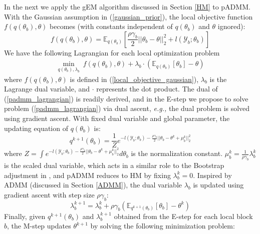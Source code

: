 \documentclass{article}
\newcommand{\eg}[0]{\emph{e.g., }}
\newcommand{\1}[0]{\ensuremath{\boldsymbol{1}}\xspace}
\begin{document}
In the next we apply the gEM algorithm discussed in Section \ref{HM} to pADMM. With the Gaussian assumption in (\ref{gaussian_prior}), the local objective function $f(q(\theta_b), \theta)$ becomes (with constants independent of $q(\theta_b)$ and $\theta$ ignored):
\begin{equation}\label{local_objective_gaussian}
f(q(\theta_b), \theta) = \mathbb{E}_{q(\theta_b)}\left[\frac{\rho\gamma_b}{2}||\theta_b - \theta||_2^2 + l(\mathcal{Y}_b; \theta_b)\right]
\end{equation}
We have the following Lagrangian for each local optimization problem
\begin{equation}\label{padmm_lagrangian}
\begin{gathered}
\textstyle \min_{q(\theta_b), \lambda_b} ~ f(q(\theta_b), \theta) + \lambda_b\cdot(\mathbb{E}_{q(\theta_b)}[\theta_b]- \theta)
\end{gathered}
\end{equation}
where $f(q(\theta_b), \theta)$ is defined in (\ref{local_objective_gaussian}), $\lambda_b$ is the Lagrange dual variable, and $\cdot$ represents the dot product. The dual of (\ref{padmm_lagrangian}) is readily derived, and in the E-step we propose to solve problem (\ref{padmm_lagrangian}) via dual ascent, \eg the dual problem is solved using gradient ascent. With fixed dual variable and global parameter, the updating equation of $q(\theta_b)$ is:
\begin{equation}\label{padmm_primal_sol}
\textstyle q^{k+1}(\theta_b) = \frac{1}{Z}e^{-l(\mathcal{Y}_b; \theta_b) -  \frac{\rho\gamma_b}{2}||\theta_b-\theta^k + \mu^k_b||^2_2}
\end{equation}
where $Z = \int e^{-l(\mathcal{Y}_b; \theta_b) -  \frac{\rho\gamma_b}{2}||\theta_b-\theta^k + \mu^k_b||^2_2} d\theta_b$ is the normalization constant. $\mu^k_b = \frac{1}{\rho\gamma_b}\lambda^k_b$ is the scaled dual variable, which acts in a similar role to the Bootstrap adjustment in \cite{YZhang2012}, and pADMM reduces to HM by fixing $\lambda^k_b = 0$. Inspired by ADMM (discussed in Section \ref{ADMM}), the dual variable $\lambda_b$ is updated using gradient ascent with step size $\rho\gamma_b$:
\begin{equation}\label{padmm_dual_sol}
\lambda^{k+1}_b = \lambda^k_b + \rho\gamma_b(\mathbb{E}_{q^{k+1}(\theta_b)}[\theta_b] - \theta^k)
\end{equation}
Finally, given $q^{k+1}(\theta_b)$ and $\lambda^{k+1}_b$ obtained from the E-step for each local block $b$, the M-step updates $\theta^{k+1}$ by solving the following minimization problem:
\end{document}
